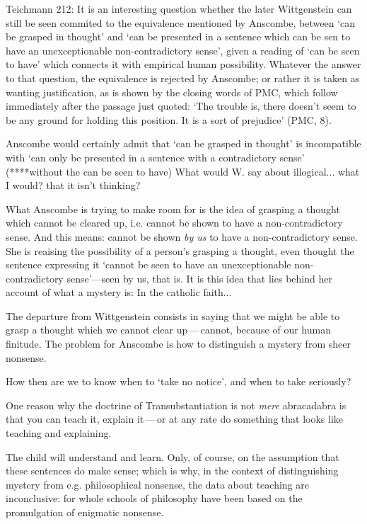   Teichmann 212:
  It is an interesting question whether the later Wittgenstein can still be seen commited to the equivalence mentioned by Anscombe, between `can be grasped in thought' and `can be presented in a sentence which can be sen to have an unexceptionable non-contradictory sense', given a reading of `can be seen to have' which connects it with empirical human possibility. Whatever the answer to that question, the equivalence is rejected by Anscombe; or rather it is taken as wanting justification, as is shown by the closing words of PMC, which follow immediately after the passage just quoted: `The trouble is, there doesn't seem to be any ground for holding this position. It is a sort of prejudice' (PMC, 8).

  Anscombe would certainly admit that `can be grasped in thought' is incompatible with `can only be presented in a sentence with a contradictory sense' (****without the can be seen to have)
  What would W. say about illogical... what I would? that it isn't thinking?

  What Anscombe is trying to make room for is the idea of grasping a thought which cannot be cleared up, i.e. cannot be shown to have a non-contradictory sense. And this means: cannot be shown \emph{by us} to have a non-contradictory sense. She is reaising the possibility of a person's grasping a thought, even thought the sentence expressing it `cannot be seen to have an unexceptionable non-contradictory sense'---seen by us, that is. It is this idea that lies behind her account of what a mystery is:
  In the catholic faith...

  The departure from Wittgenstein consists in saying that we might be able to grasp a thought which we cannot clear up\,---\,cannot, because of our human finitude. The problem for Anscombe is how to distinguish a mystery from sheer nonsense.

  How then are we to know when to `take no notice', and when to take seriously?

  One reason why the doctrine of Transubstantiation is not \emph{mere} abracadabra is that you can teach it, explain it\,---\,or at any rate do something that looks like teaching and explaining.

  The child will understand and learn. Only, of course, on the assumption that these sentences do make sense; which is why, in the context of distinguishing mystery from e.g. philosophical nonsense, the data about teaching are inconclusive: for whole schools of philosophy have been based on the promulgation of enigmatic nonsense.

